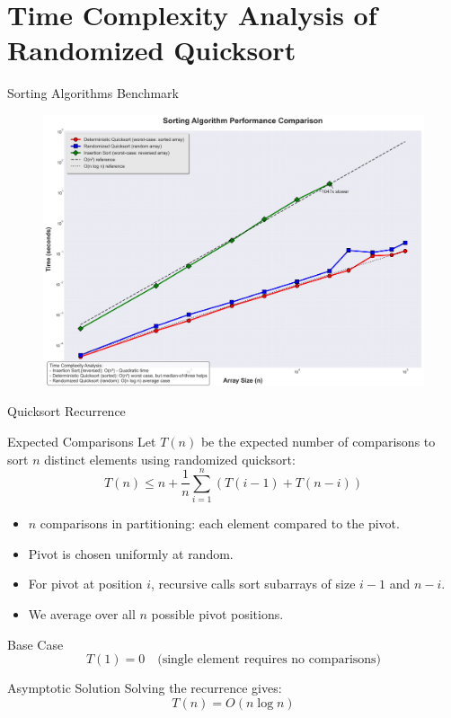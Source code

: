 \section{Time Complexity Analysis of Randomized Quicksort}
\begin{frame}{Sorting Algorithms Benchmark}
  \begin{figure}[h]
    \centering
    \includegraphics[height=0.95\textheight]{./programs/analysis_quicksort/sorting_algorithms_benchmark.png}
  \end{figure}
\end{frame}

\begin{frame}{Quicksort Recurrence}
  \begin{block}{Expected Comparisons}
    Let $T(n)$ be the expected number of comparisons to sort $n$ distinct elements using randomized quicksort:
    \[
      T(n) \leq n + \frac{1}{n} \sum_{i=1}^n (T(i-1) + T(n-i))
    \]
  \end{block}

  \begin{itemize}
    \item $n$ comparisons in partitioning: each element compared to the pivot.
    \item Pivot is chosen uniformly at random.
    \item For pivot at position $i$, recursive calls sort subarrays of size $i - 1$ and $n - i$.
    \item We average over all $n$ possible pivot positions.
  \end{itemize}

  \begin{block}{Base Case}
    \[
      T(1) = 0 \quad \text{(single element requires no comparisons)}
    \]
  \end{block}

  \begin{block}{Asymptotic Solution}
    Solving the recurrence gives:
    \[
      T(n) = O(n \log n)
    \]
    \parencite{journals/acta/Sedgewick77}
  \end{block}
\end{frame}



